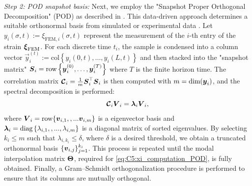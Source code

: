 \textit{Step 2: POD snapshot basis:} Next, we employ the "Snapshot Proper Orthogonal Decomposition" (POD) as described in \cite{Duriez2016,Goury2018}. This data-driven approach determines a suitable orthonormal basis from simulated or experimental data \cite{Astrid2008}. Let $y_{i}(\sigma,t) := \xi_{\textrm{FEM},i}(\sigma,t)$ represent the measurement of the $i$-th entry of the strain ${\boldsymbol{\xi}}_{\textrm{FEM}}$. For each discrete time $t_i$, the sample is condensed into a column vector $\vec{y}_i^{(t)} := \textrm{col}\left\{y_i(0,t),\dots,y_i(L,t) \right\}$ and then stacked into the "snapshot matrix" $\boldsymbol{S}_i = \textrm{row}\left\{ \boldsymbol{y}_i^{(0)},\dots,\boldsymbol{y}_i^{(T)} \right\}$ where $T$ is the finite horizon time. The correlation matrix $\boldsymbol{\mathcal{C}}_i = \tfrac{1}{m} \boldsymbol{S}_i^\top \boldsymbol{S}_i$ is then computed with $m = \text{dim}({\boldsymbol{y}}_i)$, and the spectral decomposition is performed:
%
\begin{equation}
\boldsymbol{\mathcal{C}}_i {\boldsymbol{V}}_i = \boldsymbol{\lambda}_i {\boldsymbol{V}}_i,
\end{equation}
%
where ${\boldsymbol{V}}_i = \textrm{row}\{{\boldsymbol{v}}_{i,1},,...{\boldsymbol{v}}_{i,m}\}$ is a eigenvector basis and $\boldsymbol{\lambda}_i = \textnormal{diag}\left\{ {\lambda_{i,1},,...,\lambda_{i,m}} \right\}$ is a diagonal matrix of sorted eigenvalues. By selecting $k_i \le m$ such that $\lambda_{i,k_i} \le \delta$, where $\delta$ is a desired threshold, we obtain a truncated orthonormal basis $\{{\boldsymbol{v}}_{i,j}\}_{j=1}^{k_i}$. This process is repeated until the modal interpolation matrix ${\boldsymbol{\Theta}}$, required for \eqref{eq:C5:xi_computation_POD}, is fully obtained. Finally, a Gram–Schmidt orthogonalization procedure is performed to ensure that its columns are mutually orthogonal. \\

